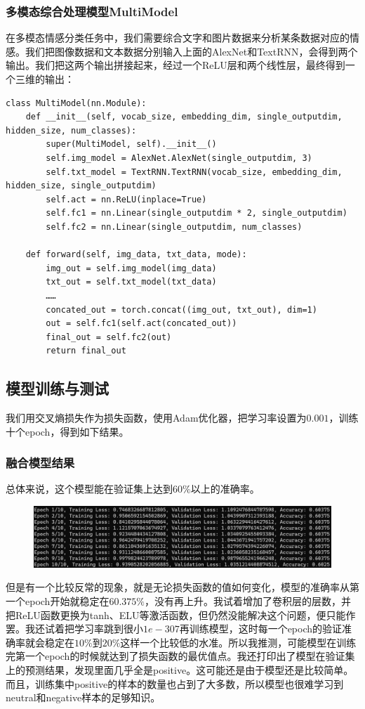 \documentclass{article}
\begin{document}
\subsubsection{多模态综合处理模型MultiModel}
在多模态情感分类任务中，我们需要综合文字和图片数据来分析某条数据对应的情感。我们把图像数据和文本数据分别输入上面的AlexNet和TextRNN，会得到两个输出。我们把这两个输出拼接起来，经过一个ReLU层和两个线性层，最终得到一个三维的输出：
\begin{lstlisting}
class MultiModel(nn.Module):
    def __init__(self, vocab_size, embedding_dim, single_outputdim, hidden_size, num_classes):
        super(MultiModel, self).__init__()
        self.img_model = AlexNet.AlexNet(single_outputdim, 3)
        self.txt_model = TextRNN.TextRNN(vocab_size, embedding_dim, hidden_size, single_outputdim)
        self.act = nn.ReLU(inplace=True)
        self.fc1 = nn.Linear(single_outputdim * 2, single_outputdim)
        self.fc2 = nn.Linear(single_outputdim, num_classes)

    def forward(self, img_data, txt_data, mode):
        img_out = self.img_model(img_data)
        txt_out = self.txt_model(txt_data)
        ……
        concated_out = torch.concat((img_out, txt_out), dim=1)
        out = self.fc1(self.act(concated_out))
        final_out = self.fc2(out)
        return final_out
\end{lstlisting}

\subsection{模型训练与测试}
我们用交叉熵损失作为损失函数，使用Adam优化器，把学习率设置为$0.001$，训练十个epoch，得到如下结果。
\subsubsection{融合模型结果}
总体来说，这个模型能在验证集上达到$60\%$以上的准确率。
\begin{figure}[h]
    \centering
    \includegraphics[width=0.5\linewidth]{融合实验结果.png}
    \label{fig:enter-label}
\end{figure}
但是有一个比较反常的现象，就是无论损失函数的值如何变化，模型的准确率从第一个epoch开始就稳定在$60.375\%$，没有再上升。我试着增加了卷积层的层数，并把ReLU函数更换为tanh、ELU等激活函数，但仍然没能解决这个问题，便只能作罢。我还试着把学习率跳到很小$1e-307$再训练模型，这时每一个epoch的验证准确率就会稳定在$10\%$到$20\%$这样一个比较低的水准。所以我推测，可能模型在训练完第一个epoch的时候就达到了损失函数的最优值点。我还打印出了模型在验证集上的预测结果，发现里面几乎全是positive。这可能还是由于模型还是比较简单。而且，训练集中positive的样本的数量也占到了大多数，所以模型也很难学习到neutral和negative样本的足够知识。
\end{document}
